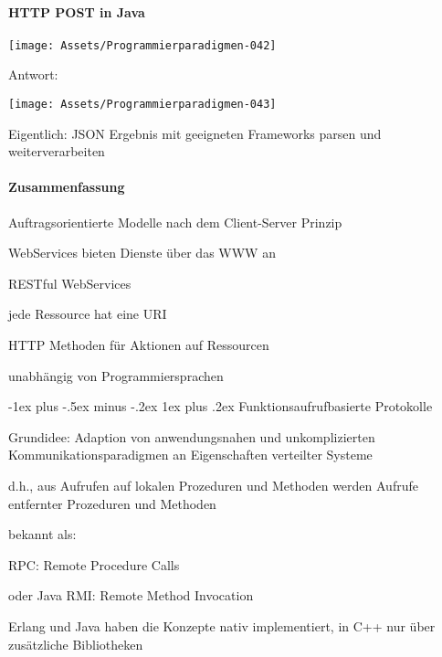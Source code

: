 \documentclass[10pt]{article}
\makeatletter
\renewcommand{\subsubsection}{\@startsection{subsubsection}{3}{0mm}%
                                {-1ex plus -.5ex minus -.2ex}%
                                {1ex plus .2ex}%
                                {\normalfont\small\bfseries}}
\makeatother
\begin{document}
\paragraph{HTTP POST in Java}
\begin{center}
  \centering
  \texttt{[image: Assets/Programmierparadigmen-042]}
\end{center}
Antwort: 
\begin{center}
  \centering
  \texttt{[image: Assets/Programmierparadigmen-043]}
\end{center}
Eigentlich: JSON Ergebnis mit geeigneten Frameworks parsen und weiterverarbeiten

\paragraph{Zusammenfassung}
\begin{itemize*}
  \item Auftragsorientierte Modelle nach dem Client-Server Prinzip
  \item WebServices bieten Dienste über das WWW an
  \item RESTful WebServices
  \begin{itemize*}
    \item jede Ressource hat eine URI
    \item HTTP Methoden für Aktionen auf Ressourcen
    \item unabhängig von Programmiersprachen
  \end{itemize*}
\end{itemize*}

\subsubsection{Funktionsaufrufbasierte Protokolle}
\begin{itemize*}
  \item Grundidee: Adaption von anwendungsnahen und unkomplizierten Kommunikationsparadigmen an Eigenschaften verteilter Systeme
  \item d.h., aus Aufrufen auf lokalen Prozeduren und Methoden werden Aufrufe entfernter Prozeduren und Methoden
  \item bekannt als:
  \begin{itemize*}
    \item RPC: Remote Procedure Calls
    \item oder Java RMI: Remote Method Invocation
  \end{itemize*}
  \item Erlang und Java haben die Konzepte nativ implementiert, in C++ nur über zusätzliche Bibliotheken
\end{itemize*}
\end{document}
